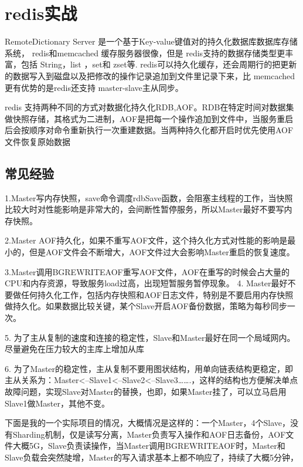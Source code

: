 \chapter{redis实战}
RemoteDictionary Server 是一个基于Key-value键值对的持久化数据库数据库存储系统， redis和memcached 缓存服务器很像，但是 redis支持的数据存储类型更丰富，包括 String，list ，set和 zset等. redis可以持久化缓存，还会周期行的把更新的数据写入到磁盘以及把修改的操作记录追加到文件里记录下来，比 memcached更有优势的是redis还支持 master-slave主从同步。

redis 支持两种不同的方式对数据化持久化RDB,AOF。RDB在特定时间对数据集做快照存储，其格式为二进制，AOF是把每一个操作追加到文件中，当服务重启后会按顺序对命令重新执行一次重建数据。当两种持久化都开启时优先使用AOF文件恢复原始数据

\section{常见经验}

1.Master写内存快照，save命令调度rdbSave函数，会阻塞主线程的工作，当快照比较大时对性能影响是非常大的，会间断性暂停服务，所以Master最好不要写内存快照。

2.Master AOF持久化，如果不重写AOF文件，这个持久化方式对性能的影响是最小的，但是AOF文件会不断增大，AOF文件过大会影响Master重启的恢复速度。

3.Master调用BGREWRITEAOF重写AOF文件，AOF在重写的时候会占大量的CPU和内存资源，导致服务load过高，出现短暂服务暂停现象。
4. Master最好不要做任何持久化工作，包括内存快照和AOF日志文件，特别是不要启用内存快照做持久化。如果数据比较关键，某个Slave开启AOF备份数据，策略为每秒同步一次。

5. 为了主从复制的速度和连接的稳定性，Slave和Master最好在同一个局域网内。尽量避免在压力较大的主库上增加从库

6. 为了Master的稳定性，主从复制不要用图状结构，用单向链表结构更稳定，即主从关系为：Master<–Slave1<–Slave2<–Slave3…….，这样的结构也方便解决单点故障问题，实现Slave对Master的替换，也即，如果Master挂了，可以立马启用Slave1做Master，其他不变。

下面是我的一个实际项目的情况，大概情况是这样的：一个Master，4个Slave，没有Sharding机制，仅是读写分离，Master负责写入操作和AOF日志备份，AOF文件大概5G，Slave负责读操作，当Master调用BGREWRITEAOF时，Master和Slave负载会突然陡增，Master的写入请求基本上都不响应了，持续了大概5分钟，

